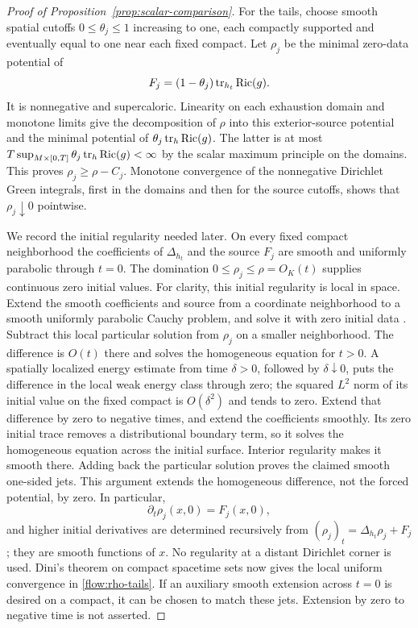 \begin{proof}[Proof of Proposition~\ref{prop:scalar-comparison}]
For the tails, choose smooth spatial cutoffs $0\le\theta_j\le1$
increasing to one, each compactly supported and eventually equal
to one near each fixed compact.  Let $\rho_j$ be the minimal
zero-data potential of
\[
 F_j=(1-\theta_j)\operatorname{tr}_{h_t}\operatorname{Ric}(g).
\]
It is nonnegative and supercaloric.  Linearity on each exhaustion
domain and monotone limits give the decomposition of $\rho$ into
this exterior-source potential and the minimal potential of
$\theta_j\operatorname{tr}_h\operatorname{Ric}(g)$.  The latter is at most
$T\sup_{M\times[0,T]}\theta_j\operatorname{tr}_h\operatorname{Ric}(g)<\infty$ by the scalar
maximum principle on the domains.  This proves
$\rho_j\ge\rho-C_j$.  Monotone convergence of the nonnegative
Dirichlet Green integrals, first in the domains and then for the
source cutoffs, shows that $\rho_j\downarrow0$ pointwise.

We record the initial regularity needed later.  On every fixed
compact neighborhood the coefficients of $\Delta_{h_t}$ and the
source $F_j$ are smooth and uniformly parabolic through $t=0$.
The domination $0\le\rho_j\le\rho=O_K(t)$ supplies continuous
zero initial values.
For clarity, this initial regularity is local in space.  Extend
the smooth coefficients and source from a coordinate neighborhood
to a smooth uniformly parabolic Cauchy problem, and solve it with
zero initial data \cite[Chapter~IV, Theorem~5.1]{LSU}.
Subtract this local particular solution from $\rho_j$ on a smaller
neighborhood.  The difference is $O(t)$ there and solves the
homogeneous equation for $t>0$.  A spatially localized energy
estimate from time $\delta>0$, followed by $\delta\downarrow0$,
puts the difference in the local weak energy class through zero;
the squared $L^2$ norm of its initial value on the fixed compact
is $O(\delta^2)$ and tends to zero.  Extend that difference by zero to
negative times, and extend the coefficients smoothly.  Its zero
initial trace removes a distributional boundary term, so it
solves the homogeneous equation across the initial surface.
Interior regularity \cite[Chapter~III, Theorem~12.1]{LSU} makes it
smooth there.  Adding back the particular solution proves the
claimed smooth one-sided jets.  This argument extends the
homogeneous difference, not the forced potential, by zero.
In particular,
\[
 \partial_t\rho_j(x,0)=F_j(x,0),
\]
and higher initial derivatives are determined recursively from
$(\rho_j)_t=\Delta_{h_t}\rho_j+F_j$; they are smooth functions of
$x$.  No regularity at a distant Dirichlet corner is used.  Dini's
theorem on compact spacetime sets now gives the local uniform
convergence in \eqref{flow:rho-tails}.  If an auxiliary smooth
extension across $t=0$ is desired on a compact, it can be chosen
to match these jets.  Extension by zero to negative time is not
asserted.


\end{proof}
